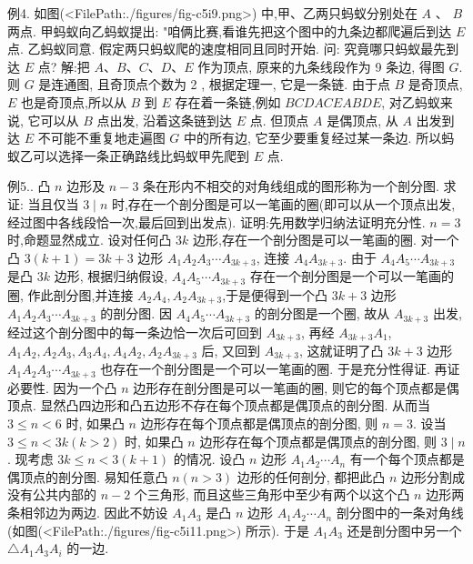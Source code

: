 例4. 如图(<FilePath:./figures/fig-c5i9.png>) 中,甲、乙两只蚂蚁分别处在 $A$ 、 $B$ 两点.
甲蚂蚁向乙蚂蚁提出: "咱俩比赛,看谁先把这个图中的九条边都爬遍后到达 $E$ 点.
乙蚂蚁同意.
假定两只蚂蚁爬的速度相同且同时开始.
问: 究竟哪只蚂蚁最先到达 $E$ 点?
解:把 $A 、 B 、 C 、 D 、 E$ 作为顶点, 原来的九条线段作为 9 条边, 得图 $G$. 则 $G$ 是连通图, 且奇顶点个数为 2 , 根据定理一, 它是一条链.
由于点 $B$ 是奇顶点, $E$ 也是奇顶点,所以从 $B$ 到 $E$ 存在着一条链,例如 $B C D A C E A B D E$,
对乙蚂蚁来说, 它可以从 $B$ 点出发, 沿着这条链到达 $E$ 点.
但顶点 $A$ 是偶顶点, 从 $A$ 出发到达 $E$ 不可能不重复地走遍图 $G$ 中的所有边, 它至少要重复经过某一条边.
所以蚂蚁乙可以选择一条正确路线比蚂蚁甲先爬到 $E$ 点.



例5.. 凸 $n$ 边形及 $n-3$ 条在形内不相交的对角线组成的图形称为一个剖分图.
求证: 当且仅当 $3 \mid n$ 时,存在一个剖分图是可以一笔画的圈(即可以从一个顶点出发,经过图中各线段恰一次,最后回到出发点). 
证明:先用数学归纳法证明充分性.
$n=3$ 时,命题显然成立.
设对任何凸 $3 k$ 边形,存在一个剖分图是可以一笔画的圈.
对一个凸 $3(k+1)=3 k+3$ 边形 $A_1 A_2 A_3 \cdots A_{3 k+3}$, 连接 $A_4 A_{3 k+3}$. 由于 $A_4 A_5 \cdots A_{3 k+3}$ 是凸 $3 k$ 边形, 根据归纳假设, $A_4 A_5 \cdots A_{3 k+3}$ 存在一个剖分图是一个可以一笔画的圈, 作此剖分图,并连接 $A_2 A_4, A_2 A_{3 k+3}$,于是便得到一个凸 $3 k+3$ 边形 $A_1 A_2 A_3 \cdots A_{3 k+3}$ 的剖分图.
因 $A_4 A_5 \cdots A_{3 k+3}$ 的剖分图是一个圈, 故从 $A_{3 k+3}$ 出发, 经过这个剖分图中的每一条边恰一次后可回到 $A_{3 k+3}$, 再经 $A_{3 k+3} A_1$,
$A_1 A_2, A_2 A_3, A_3 A_4, A_4 A_2, A_2 A_{3 k+3}$ 后, 又回到 $A_{3 k+3}$, 这就证明了凸 $3 k+3$ 边形 $A_1 A_2 A_3 \cdots A_{3 k+3}$ 也存在一个剖分图是一个可以一笔画的圈.
于是充分性得证.
再证必要性.
因为一个凸 $n$ 边形存在剖分图是可以一笔画的圈, 则它的每个顶点都是偶顶点.
显然凸四边形和凸五边形不存在每个顶点都是偶顶点的剖分图.
从而当 $3 \leqslant n<6$ 时, 如果凸 $n$ 边形存在每个顶点都是偶顶点的剖分图, 则 $n=3$.
设当 $3 \leqslant n<3 k(k>2)$ 时, 如果凸 $n$ 边形存在每个顶点都是偶顶点的剖分图, 则 $3 \mid n$. 现考虑 $3 k \leqslant n<3(k+1)$ 的情况.
设凸 $n$ 边形 $A_1 A_2 \cdots A_n$ 有一个每个顶点都是偶顶点的剖分图.
易知任意凸 $n(n>3)$ 边形的任何剖分, 都把此凸 $n$ 边形分割成没有公共内部的 $n-2$ 个三角形, 而且这些三角形中至少有两个以这个凸 $n$ 边形两条相邻边为两边.
因此不妨设 $A_1 A_3$ 是凸 $n$ 边形 $A_1 A_2 \cdots A_n$ 剖分图中的一条对角线(如图(<FilePath:./figures/fig-c5i11.png>) 所示). 于是 $A_1 A_3$ 还是剖分图中另一个 $\triangle A_1 A_3 A_i$ 的一边.
